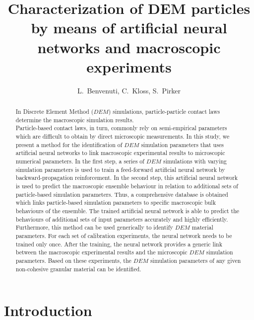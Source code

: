 \documentclass{llncs}
\begin{document}
\title{Characterization of DEM particles by means of artificial neural networks and macroscopic experiments}

\author{L.~Benvenuti, C.~Kloss, S.~Pirker}

\maketitle

\begin{abstract}

In Discrete Element Method ($DEM$) simulations, particle-particle contact laws
determine the macroscopic simulation results. \\
Particle-based contact laws, in
turn, commonly rely on semi-empirical parameters which are difficult to obtain
by direct microscopic measurements.
In this study, we present a method for the identification of
$DEM$ simulation parameters 
that uses artificial neural networks to link
macroscopic experimental results to
microscopic numerical parameters.
In the first step, a series
of $DEM$ simulations with varying simulation parameters is used to train a
feed-forward artificial neural network by backward-propagation reinforcement. 
In the second step, this artificial neural network is used to predict the
macroscopic ensemble behaviour in relation to additional sets of particle-based
simulation parameters.
Thus, a comprehensive database is obtained
which links particle-based simulation parameters to specific macroscopic
bulk behaviours of the ensemble.
The trained artificial neural network is able to predict the behaviours of
additional sets of input parameters accurately and highly efficiently.
Furthermore, this method can be used generically to
identify $DEM$ material parameters.
For each set of calibration experiments, the neural network 
needs to be trained only once.
After the training, the neural network provides a generic link between the macroscopic 
experimental results and the microscopic $DEM$ simulation parameters.
Based on these experiments, the $DEM$ simulation parameters of any given
non-cohesive granular material can be identified.

\end{abstract}

\section{Introduction}
\label{sec:introduction}
\end{document}
